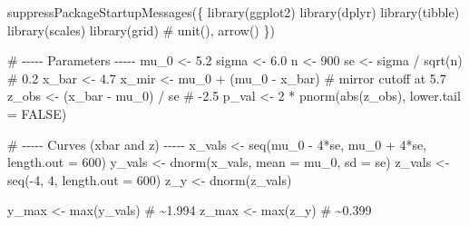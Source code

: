 \documentclass[
  letterpaper,
  DIV=11,
  numbers=noendperiod]{scrreprt}
\newenvironment{Shaded}{\begin{snugshade}}{\end{snugshade}}
\newcommand{\AttributeTok}[1]{\textcolor[rgb]{0.40,0.45,0.13}{#1}}
\newcommand{\CommentTok}[1]{\textcolor[rgb]{0.37,0.37,0.37}{#1}}
\newcommand{\ConstantTok}[1]{\textcolor[rgb]{0.56,0.35,0.01}{#1}}
\newcommand{\DecValTok}[1]{\textcolor[rgb]{0.68,0.00,0.00}{#1}}
\newcommand{\FloatTok}[1]{\textcolor[rgb]{0.68,0.00,0.00}{#1}}
\newcommand{\FunctionTok}[1]{\textcolor[rgb]{0.28,0.35,0.67}{#1}}
\newcommand{\NormalTok}[1]{\textcolor[rgb]{0.00,0.23,0.31}{#1}}
\newcommand{\OtherTok}[1]{\textcolor[rgb]{0.00,0.23,0.31}{#1}}
\newcommand{\SpecialCharTok}[1]{\textcolor[rgb]{0.37,0.37,0.37}{#1}}
\begin{document}
\begin{Shaded}
\begin{Highlighting}[]
\FunctionTok{suppressPackageStartupMessages}\NormalTok{(\{}
  \FunctionTok{library}\NormalTok{(ggplot2)}
  \FunctionTok{library}\NormalTok{(dplyr)}
  \FunctionTok{library}\NormalTok{(tibble)}
  \FunctionTok{library}\NormalTok{(scales)}
  \FunctionTok{library}\NormalTok{(grid)     }\CommentTok{\# unit(), arrow()}
\NormalTok{\})}

\CommentTok{\# {-}{-}{-}{-}{-} Parameters {-}{-}{-}{-}{-}}
\NormalTok{mu\_0  }\OtherTok{\textless{}{-}} \FloatTok{5.2}
\NormalTok{sigma }\OtherTok{\textless{}{-}} \FloatTok{6.0}
\NormalTok{n     }\OtherTok{\textless{}{-}} \DecValTok{900}
\NormalTok{se    }\OtherTok{\textless{}{-}}\NormalTok{ sigma }\SpecialCharTok{/} \FunctionTok{sqrt}\NormalTok{(n)   }\CommentTok{\# 0.2}
\NormalTok{x\_bar }\OtherTok{\textless{}{-}} \FloatTok{4.7}
\NormalTok{x\_mir }\OtherTok{\textless{}{-}}\NormalTok{ mu\_0 }\SpecialCharTok{+}\NormalTok{ (mu\_0 }\SpecialCharTok{{-}}\NormalTok{ x\_bar)   }\CommentTok{\# mirror cutoff at 5.7}
\NormalTok{z\_obs }\OtherTok{\textless{}{-}}\NormalTok{ (x\_bar }\SpecialCharTok{{-}}\NormalTok{ mu\_0) }\SpecialCharTok{/}\NormalTok{ se     }\CommentTok{\# {-}2.5}
\NormalTok{p\_val }\OtherTok{\textless{}{-}} \DecValTok{2} \SpecialCharTok{*} \FunctionTok{pnorm}\NormalTok{(}\FunctionTok{abs}\NormalTok{(z\_obs), }\AttributeTok{lower.tail =} \ConstantTok{FALSE}\NormalTok{)}

\CommentTok{\# {-}{-}{-}{-}{-} Curves (xbar and z) {-}{-}{-}{-}{-}}
\NormalTok{x\_vals }\OtherTok{\textless{}{-}} \FunctionTok{seq}\NormalTok{(mu\_0 }\SpecialCharTok{{-}} \DecValTok{4}\SpecialCharTok{*}\NormalTok{se, mu\_0 }\SpecialCharTok{+} \DecValTok{4}\SpecialCharTok{*}\NormalTok{se, }\AttributeTok{length.out =} \DecValTok{600}\NormalTok{)}
\NormalTok{y\_vals }\OtherTok{\textless{}{-}} \FunctionTok{dnorm}\NormalTok{(x\_vals, }\AttributeTok{mean =}\NormalTok{ mu\_0, }\AttributeTok{sd =}\NormalTok{ se)}
\NormalTok{z\_vals }\OtherTok{\textless{}{-}} \FunctionTok{seq}\NormalTok{(}\SpecialCharTok{{-}}\DecValTok{4}\NormalTok{, }\DecValTok{4}\NormalTok{, }\AttributeTok{length.out =} \DecValTok{600}\NormalTok{)}
\NormalTok{z\_y    }\OtherTok{\textless{}{-}} \FunctionTok{dnorm}\NormalTok{(z\_vals)}

\NormalTok{y\_max  }\OtherTok{\textless{}{-}} \FunctionTok{max}\NormalTok{(y\_vals)  }\CommentTok{\# \textasciitilde{}1.994}
\NormalTok{z\_max  }\OtherTok{\textless{}{-}} \FunctionTok{max}\NormalTok{(z\_y)     }\CommentTok{\# \textasciitilde{}0.399}


\end{Highlighting}
\end{Shaded}
\end{document}
